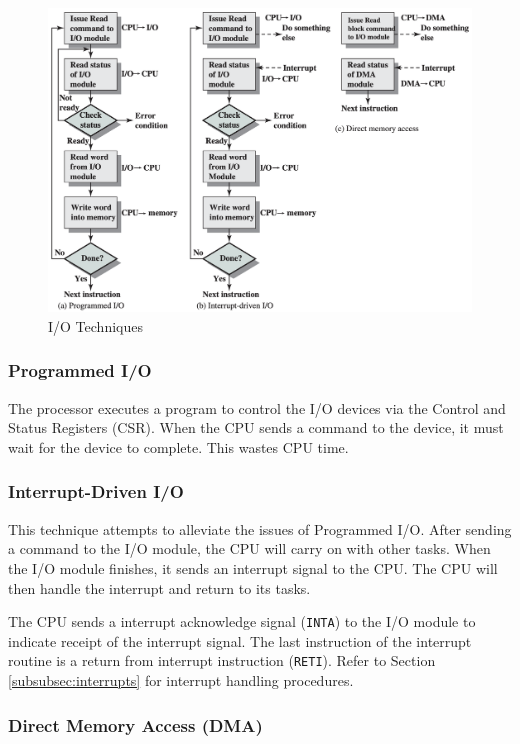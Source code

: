 \begin{figure}[htb]
    \centering
    \includegraphics[width=0.9\linewidth]{chaps/input-output/io-techniques.png}
    \caption{I/O Techniques}
\end{figure}

\subsubsection{Programmed I/O}

The processor executes a program to control the I/O devices via the Control and Status
Registers (CSR). When the CPU sends a command
to the device, it must wait for the device to complete. This wastes CPU time.

\subsubsection{Interrupt-Driven I/O}

This technique attempts to alleviate the issues of Programmed I/O. After sending a command
to the I/O module, the CPU will carry on with other tasks. When the I/O module finishes,
it sends an interrupt signal to the CPU. The CPU will then handle the interrupt and return
to its tasks.

The CPU sends a interrupt acknowledge signal (\texttt{INTA}) to the I/O module to indicate
receipt of the interrupt signal. The last instruction of the interrupt routine is a return
from interrupt instruction (\texttt{RETI}). Refer to Section \ref{subsubsec:interrupts} for
interrupt handling procedures.

\subsubsection{Direct Memory Access (DMA)}

